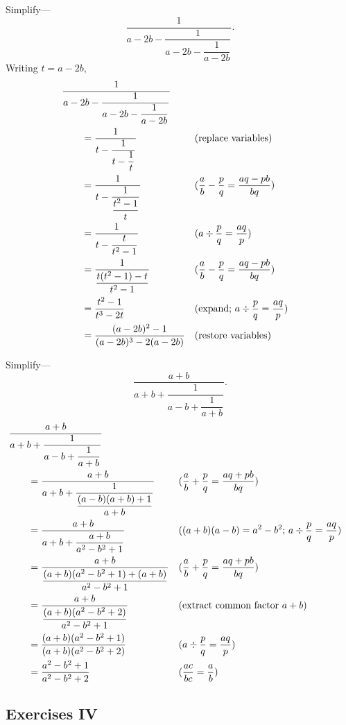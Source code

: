 \documentclass[DIN, pagenumber=false, fontsize=11pt, parskip=half]{scrartcl}
\begin{document}
\begin{problems}[from=1,step=1]
    \problem Simplify---
    \[
        \frac{1}{a - 2b - \dfrac{1}{a - 2b - \dfrac{1}{a-2b}}}.
    \]
    \answer 
    Writing $t = a-2b$,
    \begin{align*}
        \MoveEqLeft
        \frac{1}{a - 2b - \dfrac{1}{a - 2b - \dfrac{1}{a-2b}}}\\ 
        &= \frac{1}{t - \dfrac{1}{t - \dfrac{1}{t}}} && \text{(replace variables)}\\ 
        &= \frac{1}{t - \dfrac{1}{\dfrac{t^2-1}{t}}} && \text{($\frac{a}{b} - \frac{p}{q} = \frac{aq-pb}{bq}$)}\\ 
        &= \frac{1}{t - \dfrac{t}{t^2-1}} && \text{($a \div \frac{p}{q} = \frac{aq}{p}$)}\\ 
        &= \frac{1}{\dfrac{t(t^2-1)-t}{t^2-1}} && \text{($\frac{a}{b} - \frac{p}{q} = \frac{aq-pb}{bq}$)}\\ 
        &= \frac{t^2-1}{t^3-2t} && \text{(expand; $a \div \frac{p}{q} = \frac{aq}{p}$)}\\ 
        &= \frac{(a-2b)^2-1}{(a-2b)^3-2(a-2b)} && \text{(restore variables)}
    \end{align*}

    \problem Simplify---
    \[
        \frac{a+b}{a + b + \dfrac{1}{a - b + \dfrac{1}{a+b}}}.
    \]
    \answer 
    \begin{align*}
        \MoveEqLeft
        \frac{a+b}{a + b + \dfrac{1}{a - b + \dfrac{1}{a+b}}}\\ 
        &= \frac{a+b}{a + b + \dfrac{1}{\dfrac{(a-b)(a+b)+1}{a+b}}} && \text{($\frac{a}{b} + \frac{p}{q} = \frac{aq+pb}{bq}$)}\\ 
        &= \frac{a+b}{a + b + \dfrac{a+b}{a^2-b^2+1}} && \text{($(a+b)(a-b) = a^2-b^2$; $a \div \frac{p}{q} = \frac{aq}{p}$)}\\ 
        &= \frac{a+b}{\dfrac{(a+b)(a^2-b^2+1)+(a+b)}{a^2-b^2+1}} && \text{($\frac{a}{b} + \frac{p}{q} = \frac{aq+pb}{bq}$)}\\ 
        &= \frac{a+b}{\dfrac{(a+b)(a^2-b^2+2)}{a^2-b^2+1}} && \text{(extract common factor $a+b$)}\\ 
        &= \frac{(a+b)(a^2-b^2+1)}{(a+b)(a^2-b^2+2)} && \text{($a \div \frac{p}{q} = \frac{aq}{p}$)}\\ 
        &= \frac{a^2-b^2+1}{a^2-b^2+2} && \text{($\frac{ac}{bc} = \frac{a}{b}$)}
    \end{align*}
\end{problems}

\subsection{Exercises IV}
\end{document}
